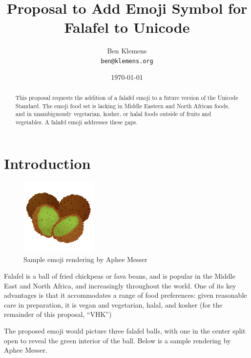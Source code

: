 \documentclass[a4paper,10pt]{article}
\begin{document}




\title{Proposal to Add Emoji Symbol for {\sc Falafel} to Unicode}
\author{Ben Klemens\\ {\tt ben@klemens.org}}
\date{\today}
\maketitle

\begin{abstract}
This proposal requests the addition of a {\sc falafel} emoji to a future version of the
Unicode Standard.  The emoji food set is lacking in Middle Eastern and North African
foods, and in unambiguously vegetarian, kosher, or halal foods outside of fruits and
vegetables. A falafel emoji addresses these gaps.
\end{abstract}


\section{Introduction}

\begin{figure}
\begin{center}
\includegraphics[width=1.5in]{falafel.png}
\end{center}
\caption{Sample emoji rendering by Aphee Messer}
\label{apheefig}
\end{figure}

{\sc Falafel} is a ball of fried chickpeas or fava beans, and is popular in the Middle East
and North Africa, and increasingly throughout the world.  One of its key advantages is
that it accommodates a range of food preferences: given reasonable care in preparation,
it is vegan and vegetarian, halal, and kosher (for the remainder of this proposal, ``VHK'')

The proposed emoji would picture three falafel balls, with one in the center split open to
reveal the green interior of the ball. Below is a sample rendering by Aphee Messer.
\end{document}
